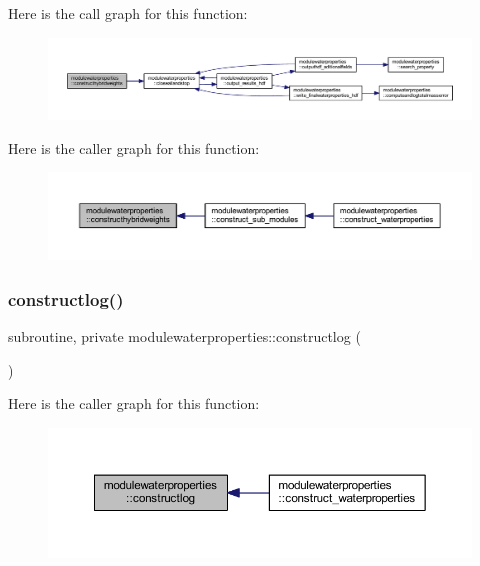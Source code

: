 Here is the call graph for this function\+:\nopagebreak
\begin{figure}[H]
\begin{center}
\leavevmode
\includegraphics[width=350pt]{namespacemodulewaterproperties_a9167d6301bd0853ded33f93fb437a619_cgraph}
\end{center}
\end{figure}
Here is the caller graph for this function\+:\nopagebreak
\begin{figure}[H]
\begin{center}
\leavevmode
\includegraphics[width=350pt]{namespacemodulewaterproperties_a9167d6301bd0853ded33f93fb437a619_icgraph}
\end{center}
\end{figure}
\mbox{\label{namespacemodulewaterproperties_a9f3f90ee5c2e83e1b90c3d1260a0d307}} 
\subsubsection{\texorpdfstring{constructlog()}{constructlog()}}
{\footnotesize\ttfamily subroutine, private modulewaterproperties\+::constructlog (\begin{DoxyParamCaption}{ }\end{DoxyParamCaption})\hspace{0.3cm}{\ttfamily [private]}}

Here is the caller graph for this function\+:\nopagebreak
\begin{figure}[H]
\begin{center}
\leavevmode
\includegraphics[width=350pt]{namespacemodulewaterproperties_a9f3f90ee5c2e83e1b90c3d1260a0d307_icgraph}
\end{center}
\end{figure}
\mbox{\label{namespacemodulewaterproperties_a6d6a2e31ca36bd79bebb89f3613ed278}} 
